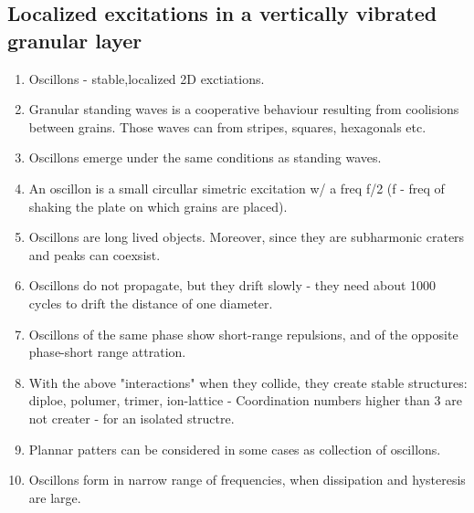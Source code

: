 \documentclass[10pt,a4paper]{article}
\begin{document}
\subsection{Localized excitations in a vertically vibrated granular layer \cite{swinney:96}}
\begin{enumerate}
 \item Oscillons - stable,localized 2D exctiations.
 \item Granular standing waves is a cooperative behaviour resulting from coolisions between grains. 
 Those waves can from stripes, squares, hexagonals etc. 
 \item Oscillons emerge under the same conditions as standing waves.
 \item An oscillon is a small circullar simetric excitation w/ a freq f/2 (f - freq of shaking the plate on which grains are placed).
 \item Oscillons are long lived objects. Moreover, since they are subharmonic craters and peaks can coexsist. 
 \item Oscillons do not propagate, but they drift slowly - they need about 1000 cycles to drift the distance of one diameter. 
 \item Oscillons of the same phase show short-range repulsions, and of the opposite phase-short range attration. 
 \item With the above "interactions" when they collide, they create stable structures: diploe, polumer, trimer, ion-lattice - Coordination numbers higher than 3 are not creater - for an isolated structre.
 \item Plannar patters can be considered in some cases as collection of oscillons. 
 \item Oscillons form in narrow range of frequencies, when dissipation and hysteresis are large. 
\end{enumerate}
\end{document}
